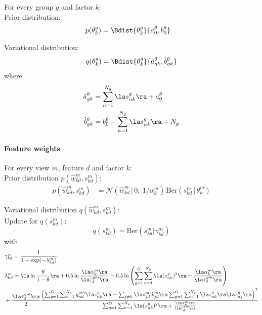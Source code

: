 For every group $g$ and factor $k$: \\

Prior distribution:
\begin{align}
	p(\theta_k^g) &= \Bdist{\theta_k^g}{a_0^\theta,b_0^\theta}
\end{align}

Variational distribution:
\begin{equation}
	q(\theta_k^g) = \Bdist{\theta_k^g}{\hat{a}_{gk}^{\theta}, \hat{b}_{gk}^{\theta}}
\end{equation}
where
\begin{equation}
     \begin{aligned}
  	\hat{a}_{gk}^\theta &= \sum_{n=1}^{N_g} \la s^g_{nk}\ra + a_0^\theta\\
  	\hat{b}_{gk}^\theta &= b_0^\theta - \sum_{n=1}^{N_g} \la s^g_{nk}\ra + N_g
     \end{aligned}
\end{equation}

\paragraph*{Feature weights}
For every view $m$, feature $d$ and factor $k$: \\

Prior distribution $p(\hat{w}_{kd}^m,s_{kd}^m)$:
\begin{align}
	p(\hat{w}_{kd}^m,s_{kd}^m) &= \mathcal{N} (\hat{w}_{kd}^m \,|\, 0, ~ 1/\alpha_k^m)\, \text{Ber}(s_{kd}^m \,|\,\theta_k^m)
\end{align}

Variational distribution $q(\hat{w}_{kd}^m,s_{kd}^m)$:\\

Update for $q(s_{kd}^m)$:
\begin{equation}
	q(s^m_{kd}) = \mathrm{Ber}(s^m_{kd}|\gamma^m_{kd})
\end{equation}
with
\begin{equation} \begin{aligned}
	&\gamma^m_{kd} = \frac{1}{1+\exp(-\lambda_{kd}^m)}\\
	& \lambda_{kd}^m = \la \ln\frac{\theta}{1-\theta} \ra + 0.5\ln\frac{\la\alpha_k^m\ra}{\la\tau_d^{gm}\ra} - 0.5\ln\left( \sum_{g=1}^G\sum_{n=1}^{N_g} \la (z_{nk}^g)^2 \ra + \frac{\la\alpha_k^m\ra}{\la\tau_d^{gm}\ra} \right) \\
	&+ \frac{\la\tau_d^{gm}\ra}{2} \frac{ \left( \sum_{g=1}^G\sum_{n=1}^{N_g} y_{nd}^{gm} \la z^g_{nk} \ra - \sum_{j \neq k} \la s_{jd}^m\hat{w}_{jd}^m\ra \sum_{g=1}^G\sum_{n=1}^{N_g} \la z^g_{nk} \ra \la z^g_{nj} \ra \right)^2} {\sum_{g=1}^G\sum_{n=1}^{N_g} \la (z_{nk}^g)^2 \ra + \frac{\la\alpha_k^m\ra}{\la\tau_d^{gm}\ra} }
\end{aligned} \end{equation}

